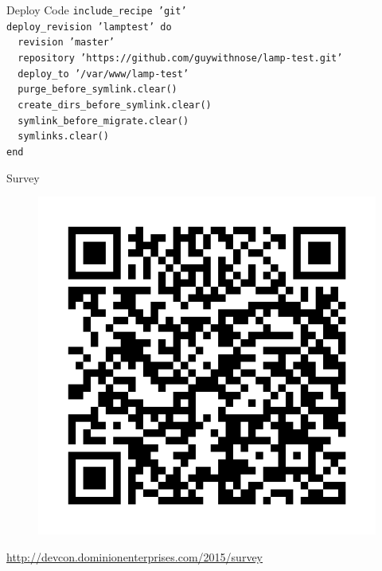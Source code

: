 \documentclass{beamer}
\begin{document}
    \begin{frame}{Deploy Code}
        \texttt{include\_recipe 'git'\\
            \medskip
            deploy\_revision 'lamptest' do\\
            ~~revision 'master'\\
            ~~repository 'https://github.com/guywithnose/lamp-test.git'\\
            ~~deploy\_to '/var/www/lamp-test'\\
            ~~purge\_before\_symlink.clear()\\
            ~~create\_dirs\_before\_symlink.clear()\\
            ~~symlink\_before\_migrate.clear()\\
            ~~symlinks.clear()\\
            end
        }
    \end{frame}
    \begin{frame}{Survey}
        \begin{figure}[htpb]
            \centering
            \includegraphics[width=0.4\linewidth]{survey.jpg}
        \end{figure}
        \href{http://devcon.dominionenterprises.com/2015/survey}{http://devcon.dominionenterprises.com/2015/survey}
    \end{frame}
\end{document}
